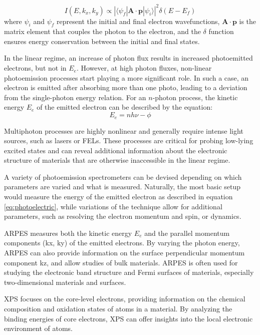 \begin{equation}
    I(E, k_x, k_y) \propto |\langle \psi_f | \mathbf{A} \cdot \mathbf{p} | \psi_i \rangle|^2 \delta(E - E_f)
\end{equation}
where $\psi_i$ and $\psi_f$ represent the initial and final electron wavefunctions, $\mathbf{A} \cdot \mathbf{p}$ is the matrix element that couples the photon to the electron, and the $\delta$ function ensures energy conservation between the initial and final states.

In the linear regime, an increase of photon flux results in increased photoemitted electrons, but not in $E_e$. However, at high photon fluxes, non-linear photoemission processes start playing a more significant role. In such a case, an electron is emitted after absorbing more than one photo, leading to a deviation from the single-photon energy relation. For an $n$-photon process, the kinetic energy $E_e$ of the emitted electron can be described by the equation:
\begin{equation}
    E_e = n h\nu - \phi
\end{equation}

Multiphoton processes are highly nonlinear and generally require intense light sources, such as lasers or \glspl{FEL}. These processes are critical for probing low-lying excited states and can reveal additional information about the electronic structure of materials that are otherwise inaccessible in the linear regime.

A variety of photoemission spectrometers can be devised depending on which parameters are varied and what is measured. Naturally, the most basic setup would measure the energy of the emitted electron as described in equation \ref{eq:photoelectric}, while variations of the technique allow for additional parameters, such as resolving the electron momentum and spin, or dynamics.

\gls{ARPES} measures both the kinetic energy $E_e$ and the parallel momentum components (\gls{kx}, \gls{ky}) of the emitted electrons. By varying the photon energy, \gls{ARPES} can also provide information on the surface perpendicular momentum component \gls{kz}, and allow studies of bulk materials. \gls{ARPES} is often used for studying the electronic band structure and Fermi surfaces of materials, especially two-dimensional materials and surfaces.

\gls{XPS} focuses on the core-level electrons, providing information on the chemical composition and oxidation states of atoms in a material. By analyzing the binding energies of core electrons, \gls{XPS} can offer insights into the local electronic environment of atoms.

